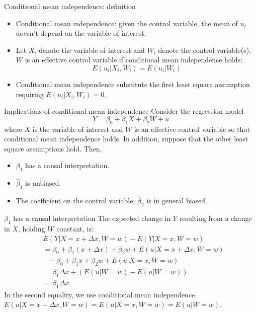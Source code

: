 \documentclass[presentation,10pt]{beamer}
\begin{document}
\begin{frame}[label={sec:org679cdc0}]{Conditional mean independence: definition}
\begin{itemize}
\item \alert{Conditional mean independence}: given the
control variable, the mean of \(u_i\) doesn’t depend on the variable of
interest.
\end{itemize}

\vspace{0.2cm}

\begin{itemize}
\item Let \(X_i\) denote the variable of interest and \(W_i\) denote the control
variable(s).  \(W\) is an effective control variable if conditional mean
independence holds:
\[ E(u_i|X_i, W_i) = E(u_i|W_i) \]

\item Conditional mean independence substitute the first least square
assumption requiring \(E(u_i | X_i, W_i) = 0\).
\end{itemize}
\end{frame}

\begin{frame}[label={sec:org9446052}]{Implications of conditional mean independence}
Consider the regression model
\[ Y = \beta_0 + \beta_1 X + \beta_2 W + u \]
where \(X\) is the variable of interest and \(W\) is an effective control
variable so that conditional mean independence holds. In addition,
suppose that the other least square assumptions hold. Then,
\begin{itemize}
\item \(\beta_1\) has a causal interpretation.
\item \(\hat{\beta}_1\) is unbiased.
\item The coefficient on the control variable, \(\hat{\beta}_2\) is in
general biased.
\end{itemize}
\end{frame}

\begin{frame}[label={sec:orgf2bbde8}]{\(\beta_1\) has a causal interpretation}
The expected change in \(Y\) resulting from a change in \(X\), holding \(W\)
constant, is:
\begin{equation*}
\begin{split}
& E(Y|X = x + \Delta x, W = w) - E(Y|X = x, W = w) \\
&= \beta_0 + \beta_1(x + \Delta x) + \beta_2 w + E(u|X = x + \Delta x, W = w) \\
&\text{ } - \beta_0 + \beta_1 x + \beta_2 w + E(u|X = x, W = w) \\
&= \beta_1 \Delta x + \left( E(u|W = w) -  E(u|W = w) \right) \\
&= \beta_1 \Delta x
\end{split}
\end{equation*}
In the second equality, we use conditional mean independence \(E(u|X =
x + \Delta x, W = w) = E(u|X = x, W = w) = E(u|W = w)\).
\end{frame}
\end{document}
